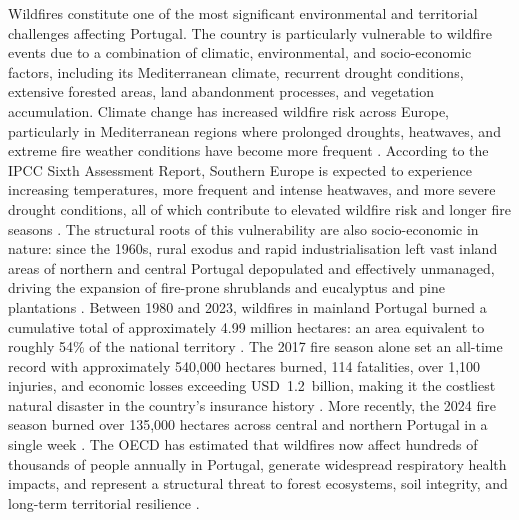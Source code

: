Wildfires constitute one of the most significant environmental and territorial
challenges affecting Portugal. The country is particularly vulnerable to wildfire
events due to a combination of climatic, environmental, and socio-economic factors,
including its Mediterranean climate, recurrent drought conditions, extensive forested
areas, land abandonment processes, and vegetation accumulation. Climate change has
increased wildfire risk across Europe, particularly in Mediterranean regions where
prolonged droughts, heatwaves, and extreme fire weather conditions have become more
frequent \cite{EEAForestFires2021}. According to the IPCC Sixth Assessment Report,
Southern Europe is expected to experience increasing temperatures, more frequent and
intense heatwaves, and more severe drought conditions, all of which contribute to
elevated wildfire risk and longer fire seasons \cite{BednarFriedl2022Europe}. The
structural roots of this vulnerability are also socio-economic in nature: since the
1960s, rural exodus and rapid industrialisation left vast inland areas of northern and
central Portugal depopulated and effectively unmanaged, driving the expansion of
fire-prone shrublands and eucalyptus and pine plantations \cite{EnviroSociety2022}.
Between 1980 and 2023, wildfires in mainland Portugal burned a cumulative total of
approximately 4.99 million hectares: an area equivalent to roughly 54\% of the
national territory \cite{TheSignatureofClimateinAnnualBurnedAreainPortugal}. The 2017 fire season alone set an
all-time record with approximately 540,000 hectares burned, 114 fatalities, over
1,100 injuries, and economic losses exceeding USD~1.2~billion, making it the costliest
natural disaster in the country's insurance history \cite{ThecompoundeventthattriggeredthedestructivefiresofOctober2017inPortugal}. More
recently, the 2024 fire season burned over 135,000 hectares across central and northern
Portugal in a single week \cite{AdvanceReportonForestFiresinEurope}. The OECD has estimated that
wildfires now affect hundreds of thousands of people annually in Portugal, generate
widespread respiratory health impacts, and represent a structural threat to forest
ecosystems, soil integrity, and long-term territorial resilience \cite{OECD2023Portugal}.\\

